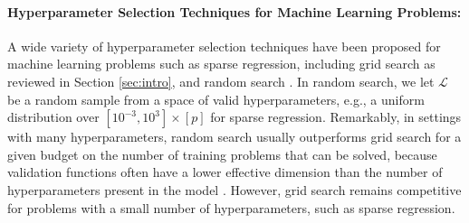 \documentclass[ijoc,noblindrev]{informs3} %
\newcommand{\ag}[1]{{\color{black}#1}}
\begin{document}
\paragraph{Hyperparameter Selection Techniques for Machine Learning Problems:} 
A wide variety of hyperparameter selection techniques have been proposed for machine learning problems such as sparse regression, 
{\color{black}including grid search \citep[][]{larochelle2007empirical} as reviewed in Section \ref{sec:intro},}
{\color{black}and random search \citep[cf.][]{bergstra2012random}.} %
In random search, we let $\mathcal{L}$ be a random sample from a space of valid hyperparameters, e.g., a uniform distribution over $[10^{-3}, 10^3] \times [p]$ for sparse regression. Remarkably, in settings with many hyperparameters, random search usually outperforms grid search for a given budget on the number of training problems that can be solved, because validation functions often have a lower effective dimension than the number of hyperparameters present in the model \citep[][]{bergstra2012random}. %
However, grid search remains competitive for problems with a small number of hyperparameters, such as sparse regression. %
\end{document}
